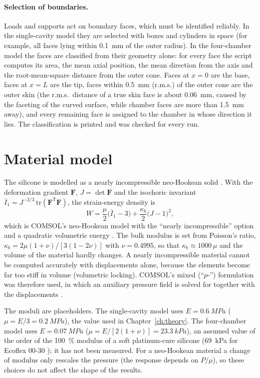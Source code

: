 \documentclass[12pt,a4paper,oneside]{report}
\numberwithin{equation}{chapter}
\numberwithin{figure}{chapter}
\numberwithin{table}{chapter}
\begin{document}
\paragraph{Selection of boundaries.} Loads and supports act on boundary faces, which must be identified
reliably. In the single-cavity model they are selected with boxes and cylinders in space (for example, all
faces lying within \SI{0.1}{mm} of the outer radius). In the four-chamber model the faces are classified
from their geometry alone: for every face the script computes its area, the mean axial position, the mean
direction from the axis and the root-mean-square distance from the outer cone. Faces at $x=0$ are the base,
faces at $x=L$ are the tip, faces within \SI{0.5}{mm} (r.m.s.) of the outer cone are the outer skin (the
r.m.s.\ distance of a true skin face is about \SI{0.06}{mm}, caused by the faceting of the curved surface,
while chamber faces are more than \SI{1.5}{mm} away), and every remaining face is assigned to the chamber in
whose direction it lies. The classification is printed and was checked for every run.

\section{Material model}
The silicone is modelled as a nearly incompressible neo-Hookean solid \cite{treloar1975,holzapfel2000}. With
the deformation gradient $\bm F$, $J=\det\bm F$ and the isochoric invariant
$\bar I_1=J^{-2/3}\,\mathrm{tr}(\bm F^{\mathsf T}\bm F)$, the strain-energy density is
\begin{equation}
W=\frac{\mu}{2}\big(\bar I_1-3\big)+\frac{\kappa_b}{2}\big(J-1\big)^2 , \label{eq:nh}
\end{equation}
which is COMSOL's neo-Hookean model with the ``nearly incompressible'' option and a quadratic volumetric
energy \cite{comsolsm}. The bulk modulus is set from Poisson's ratio,
$\kappa_b=2\mu(1+\nu)/[3(1-2\nu)]$ with $\nu=0.4995$, so that $\kappa_b\approx1000\,\mu$ and the volume of the
material hardly changes. A nearly incompressible material cannot be computed accurately with displacements
alone, because the elements become far too stiff in volume (volumetric locking). COMSOL's mixed
(``$p$-'') formulation was therefore used, in which an auxiliary pressure field is solved for together with
the displacements \cite{holzapfel2000,comsolsm}.

The moduli are placeholders. The single-cavity model uses $E=\SI{0.6}{MPa}$ ($\mu=E/3=\SI{0.2}{MPa}$), the value
used in Chapter~\ref{ch:theory}. The four-chamber model uses $E=\SI{0.07}{MPa}$ ($\mu=E/[2(1+\nu)]=\SI{23.3}{kPa}$),
an assumed value of the order of the \SI{100}{\percent} modulus of a soft platinum-cure silicone
(\SI{69}{kPa} for Ecoflex 00-30 \cite{ecoflex}); it has not been measured. For a neo-Hookean material a
change of modulus only rescales the pressure (the response depends on $P/\mu$), so these choices do not
affect the shape of the results.
\end{document}
